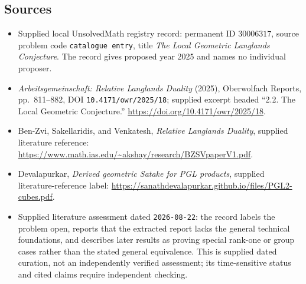 \documentclass[11pt]{article}
\begin{document}
\subsection{Sources}
\begin{itemize}
\item Supplied local UnsolvedMath registry record: permanent ID \(30006317\), source problem code \texttt{catalogue entry}, title \emph{The Local Geometric Langlands Conjecture}. The record gives proposed year 2025 and names no individual proposer.
\item \emph{Arbeitsgemeinschaft: Relative Langlands Duality} (2025), Oberwolfach Reports, pp.\ 811--882, DOI \texttt{10.4171/owr/2025/18}; supplied excerpt headed ``2.2. The Local Geometric Conjecture.'' \url{https://doi.org/10.4171/owr/2025/18}.
\item Ben-Zvi, Sakellaridis, and Venkatesh, \emph{Relative Langlands Duality}, supplied literature reference: \url{https://www.math.ias.edu/~akshay/research/BZSVpaperV1.pdf}.
\item Devalapurkar, \emph{Derived geometric Satake for PGL products}, supplied literature-reference label: \url{https://sanathdevalapurkar.github.io/files/PGL2-cubes.pdf}.
\item Supplied literature assessment dated \texttt{2026-08-22}: the record labels the problem open, reports that the extracted report lacks the general technical foundations, and describes later results as proving special rank-one or group cases rather than the stated general equivalence. This is supplied dated curation, not an independently verified assessment; its time-sensitive status and cited claims require independent checking.
\end{itemize}
\end{document}
